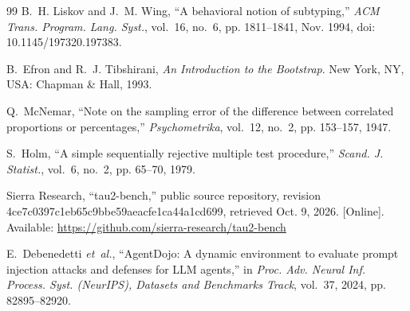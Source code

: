 \documentclass[10pt,journal,compsoc]{IEEEtran}
\begin{document}
\begin{thebibliography}{99}
B.~H. Liskov and J.~M. Wing, ``A behavioral notion of subtyping,'' \emph{ACM Trans. Program. Lang. Syst.}, vol.~16, no.~6, pp. 1811--1841, Nov. 1994, doi: 10.1145/197320.197383.

B.~Efron and R.~J. Tibshirani, \emph{An Introduction to the Bootstrap}. New York, NY, USA: Chapman \& Hall, 1993.

Q.~McNemar, ``Note on the sampling error of the difference between correlated proportions or percentages,'' \emph{Psychometrika}, vol.~12, no.~2, pp. 153--157, 1947.

S.~Holm, ``A simple sequentially rejective multiple test procedure,'' \emph{Scand. J. Statist.}, vol.~6, no.~2, pp. 65--70, 1979.

Sierra Research, ``tau2-bench,'' public source repository, revision 4ce7c0397c1eb65c9bbe59aeacfe1ca44a1cd699, retrieved Oct. 9, 2026. [Online]. Available: \url{https://github.com/sierra-research/tau2-bench}

E.~Debenedetti \emph{et~al.}, ``AgentDojo: A dynamic environment to evaluate prompt injection attacks and defenses for LLM agents,'' in \emph{Proc. Adv. Neural Inf. Process. Syst. (NeurIPS), Datasets and Benchmarks Track}, vol.~37, 2024, pp. 82895--82920.

\end{thebibliography}
\end{document}
